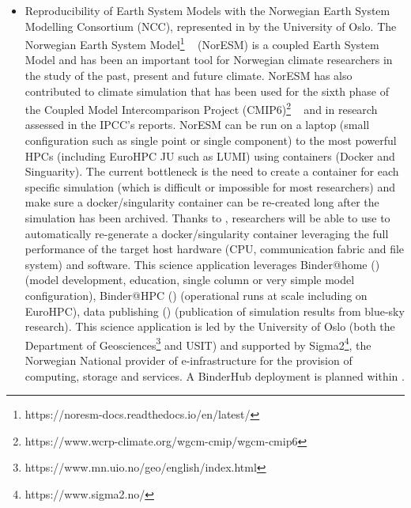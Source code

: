 \begin{itemize}
  data at the University of Oslo and will leverage on \TheProject work for data publishing ()
  to increase the re-use of enormous amounts of data that will be made available to everyone through FAIR@UiO platform. 
  FAIR@UiO is led by the University's Center for Information Technology of the University of Oslo 
  (USIT\footnote{https://www.usit.uio.no/}).
\item Reproducibility of Earth System Models with the Norwegian Earth System Modelling Consortium (NCC),
   represented in \TheProject by the University of Oslo. The Norwegian Earth System Model\footnote{https://noresm-docs.readthedocs.io/en/latest/}
  ~\cite{Seland2020} (NorESM) is a coupled Earth System Model and has been an important tool for Norwegian 
  climate researchers in the study of the past, present and future climate. NorESM has also contributed
   to climate simulation that has been used for the sixth phase of the Coupled Model Intercomparison Project (CMIP6)\footnote{https://www.wcrp-climate.org/wgcm-cmip/wgcm-cmip6} 
   ~\cite{Seland2020} and in research assessed in the IPCC’s reports. 
   NorESM can be run on a laptop (small configuration such as single 
  point or single component) to the most powerful HPCs (including EuroHPC JU such as LUMI) using containers (Docker and Singuarity). 
  The current bottleneck is the need to create a container for each specific
  simulation (which is difficult or impossible for most researchers) and
  make sure a docker/singularity container can be re-created long after the simulation has been archived.
  Thanks to \TheProject, researchers will be able to use \repotodocker{} to automatically re-generate a docker/singularity container leveraging the full performance of the target host hardware (CPU, communication fabric and file system) and software.
  This science application leverages Binder@home () (model
development, education, single column or very simple model configuration), Binder@HPC () (operational runs at scale including on EuroHPC), 
data publishing  () (publication of simulation results from
blue-sky research). This science application is led by the University of Oslo (both the Department of Geosciences\footnote{https://www.mn.uio.no/geo/english/index.html} and USIT) 
and supported by Sigma2\footnote{https://www.sigma2.no/}, the Norwegian National
provider of e-infrastructure for the provision of computing, storage and
services. A BinderHub deployment is planned within \TheProject. 

\end{itemize}

